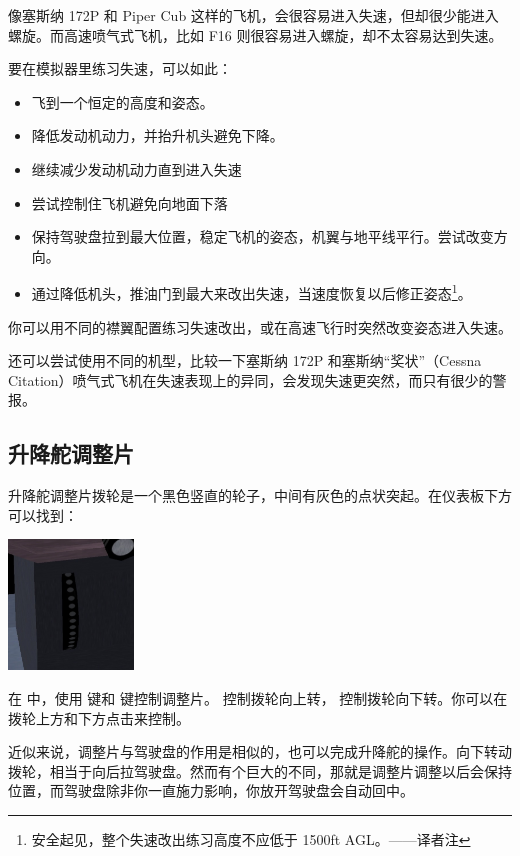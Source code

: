 像塞斯纳 172P 和 Piper Cub 这样的飞机，会很容易进入失速，但却很少能进入螺旋。而高速喷气式飞机，比如 F16 则很容易进入螺旋，却不太容易达到失速。

要在模拟器里练习失速，可以如此：
\begin{itemize}
    \item 飞到一个恒定的高度和姿态。
    \item 降低发动机动力，并抬升机头避免下降。
    \item 继续减少发动机动力直到进入失速
    \item 尝试控制住飞机避免向地面下落
    \item 保持驾驶盘拉到最大位置，稳定飞机的姿态，机翼与地平线平行。尝试改变方向。
    \item 通过降低机头，推油门到最大来改出失速，当速度恢复以后修正姿态\footnote{安全起见，整个失速改出练习高度不应低于 1500ft AGL。——译者注}。
\end{itemize}

你可以用不同的襟翼配置练习失速改出，或在高速飞行时突然改变姿态进入失速。

还可以尝试使用不同的机型，比较一下塞斯纳 172P 和塞斯纳“奖状”（Cessna Citation）喷气式飞机在失速表现上的异同，会发现失速更突然，而只有很少的警报。

\subsection{升降舵调整片}
\label{sec:Trim}

升降舵调整片拨轮是一个黑色竖直的轮子，中间有灰色的点状突起。在仪表板下方可以找到：

\begin{center}
\includegraphics[width=0.25\textwidth]{img/tut_35}
\end{center}

在 \FlightGear{} 中，使用  键和  键控制调整片。 控制拨轮向上转，  控制拨轮向下转。你可以在拨轮上方和下方点击来控制。

近似来说，调整片与驾驶盘的作用是相似的，也可以完成升降舵的操作。向下转动拨轮，相当于向后拉驾驶盘。然而有个巨大的不同，那就是调整片调整以后会保持位置，而驾驶盘除非你一直施力影响，你放开驾驶盘会自动回中。

